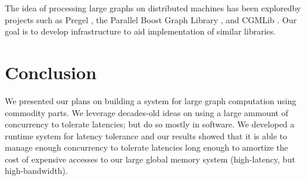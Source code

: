 \documentclass[10pt,nocopyrightspace,preprint]{sigplanconf}
\begin{document}
The idea of processing large graphs on distributed machines has been
exploredby projects such as Pregel \cite{pregel}, the Parallel Boost
Graph Library \cite{parallelbgl}, and CGMLib \cite{cgmlib}. Our goal
is to develop infrastructure to aid implementation of similar
libraries.

\section{Conclusion}
\label{sec:conclusion}

We presented our plans on building a system for large graph
computation using commodity parts. We leverage decades-old ideas on
using a large ammount of concurrency to tolerate latencies; but do so
mostly in software. We developed a runtime system for latency
tolerance and our results showed that it is able to manage enough
concurrency to tolerate latencies long enough to amortize the cost of
expensive accesses to our large global memory system (high-latency,
but high-bandwidth).



\end{document}
